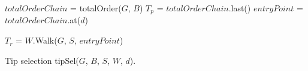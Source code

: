 \IncMargin{1em}
\begin{algorithm}


$totalOrderChain$ = totalOrder($G$, $B$) \;
$T_p$ = $totalOrderChain$.last() \;
$entryPoint$ = $totalOrderChain$.at($d$) \; 

 {
    $T_r$ = $W$.Walk($G$, $S$, $entryPoint$) \;
}

 \;

\caption{{\sc Tip selection tipSel($G$, $B$, $S$, $W$, $d$).}}
\label{algo:tip_sel}
\end{algorithm}
\DecMargin{1em}
